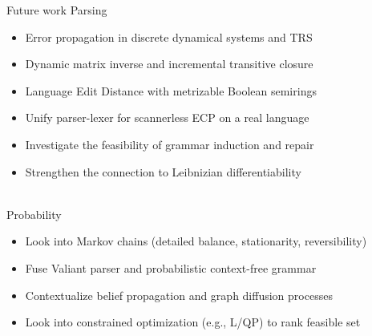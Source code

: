 \documentclass{beamer}
\begin{document}
\begin{frame}{Future work}
  Parsing
  \begin{itemize}
    \item Error propagation in discrete dynamical systems and TRS
    \item Dynamic matrix inverse and incremental transitive closure
    \item Language Edit Distance with metrizable Boolean semirings
    \item Unify parser-lexer for scannerless ECP on a real language
    \item Investigate the feasibility of grammar induction and repair
    \item Strengthen the connection to Leibnizian differentiability
  \end{itemize}
  \phantom{space}\\
  Probability
  \begin{itemize}
    \item Look into Markov chains (detailed balance, stationarity, reversibility)
    \item Fuse Valiant parser and probabilistic context-free grammar
    \item Contextualize belief propagation and graph diffusion processes
    \item Look into constrained optimization (e.g., L/QP) to rank feasible set
  \end{itemize}
\end{frame}
\end{document}

